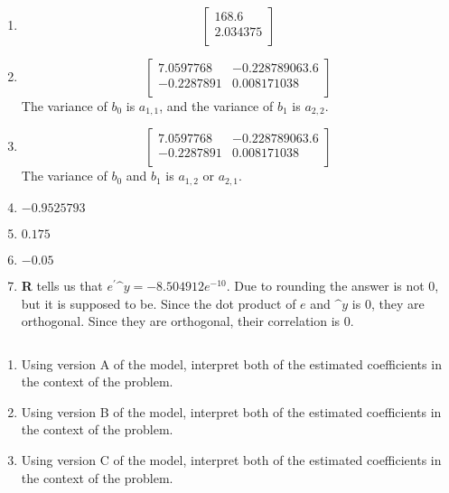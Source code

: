 \documentclass[10pt]{article}
\newenvironment{problem}[2][Problem]{\begin{trivlist}
\item[\hskip \labelsep {\bfseries #1}\hskip \labelsep {\bfseries #2.}]}{\end{trivlist}}
\newenvironment{answer}[2][Answer]{\begin{trivlist}
\item[\hskip \labelsep {\bfseries #1}\hskip \labelsep {\bfseries #2.}]}{\end{trivlist}}
\begin{document}
\begin{answer}{9}
$ $\newline
\begin{enumerate}
    \item \[
\begin{bmatrix}
    168.6 \\
    2.034375 \\
\end{bmatrix}
            \]
    \item \[
\begin{bmatrix}
    7.0597768 & -0.228789063.6 \\
    -0.2287891 & 0.008171038 \\
\end{bmatrix}
            \]
            The variance of $b_{0}$ is $a_{1,1}$, and the variance of $b_{1}$ is $a_{2,2}$.

\item \[
\begin{bmatrix}
    7.0597768 & -0.228789063.6 \\
    -0.2287891 & 0.008171038 \\
\end{bmatrix}
            \]
            The variance of $b_{0}$ and $b_{1}$ is $a_{1,2}$ or $a_{2,1}$.
    \item $-0.9525793$
    \item $0.175$
    \item $-0.05$
    \item \textbf{R} tells us that $e^{'}\^y = -8.504912e^{-10}$. Due to rounding the answer is not 0, but it is supposed to be. Since the dot product of $e$ and $\^y$ is 0, they are orthogonal. Since they are orthogonal, their correlation is 0.
\end{enumerate}
\end{answer}

\begin{problem}{11}
$ $\newline
    \begin{enumerate}
        \item Using version A of the model, interpret both of the estimated coefficients in the context of the problem. 
        \item Using version B of the model, interpret both of the estimated coefficients in the context of the problem. 
        \item Using version C of the model, interpret both of the estimated coefficients in the context of the problem. 
    \end{enumerate}
\end{problem}
\end{document}
